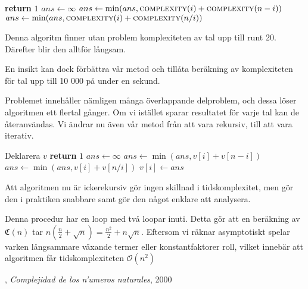 \documentclass[a4paper,titlepage,draft]{article}
\newcommand{\C}[1]{\mathfrak C \left( #1 \right)}
\theoremstyle{definition}
\begin{document}
\begin{algorithm}[H]
    \caption{$O(N^N)$}
    \begin{algorithmic}[1]
                \State \textbf{return} $1$
            \EndIf
            \State  $ans\gets \infty$
                \State $ans\gets \min(ans, \textsc{complexity}(i)+\textsc{complexity}(n-i))$
            \EndFor
                    \State $ans\gets \min(ans, \textsc{complexity}(i)+\textsc{complexity}(n/i))$
                \EndIf
            \EndFor
        \EndProcedure
    \end{algorithmic}
\end{algorithm}

Denna algoritm finner utan problem komplexiteten av tal upp till runt 20.
Därefter blir den alltför långsam.

En insikt kan dock förbättra vår metod och tillåta beräkning av komplexiteten
för tal upp till 10 000 på under en sekund.

Problemet innehåller nämligen många överlappande delproblem, och dessa löser
algoritmen ett flertal gånger. Om vi istället sparar resultatet för varje tal
kan de återanvändas. Vi ändrar nu även vår metod från att vara rekursiv, till
att vara iterativ.


\begin{algorithm}[H]
    \caption{$O(N^2)$}
    \begin{algorithmic}[1]
            \State Deklarera $v$
                \State \textbf{return} $1$
                \State  $ans\gets \infty$
                    \State $ans\gets \min(ans, v[i]+ v[n-i])$
                \EndFor
                        \State $ans\gets \min(ans, v[i]+v[n/i])$
                    \EndIf
                \EndFor
                \State $v[i] \gets ans$
            \EndFor
        \EndProcedure
    \end{algorithmic}
\end{algorithm}


Att algoritmen nu är ickerekursiv gör ingen skillnad i tidskomplexitet, men gör
den i praktiken snabbare samt gör den något enklare att analysera.

Denna procedur har en loop med två loopar inuti. Detta gör att en beräkning av
$\C{n}$ tar $n\left(\frac{n}{2}+\sqrt n\right) = \frac{n^2}{2} + n\sqrt n$.
Eftersom vi räknar asymptotiskt spelar varken långsammare växande termer eller
konstantfaktorer roll,  vilket innebär att algoritmen får tidskomplexiteten
$\mathcal{O}(n^2)$

\newpage
\begin{thebibliography}{9}
        , \emph{Complejidad de los n'umeros naturales}, 2000

\end{thebibliography}
%
\end{document}
